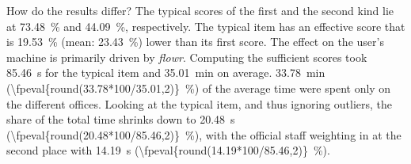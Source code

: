 \documentclass{article}
\def\share#1#2{\qty{\fpeval{round(#1*100/#2,2)}}{\percent}}
\begin{document}
\begin{answers}{How do the results differ?}{
  The typical scores of the first and the second kind lie at \qty{73.48}{\percent} and
  \qty{44.09}{\percent}, respectively. The typical item has an effective score that is
  \qty{19.53}{\percent} (mean: \qty{23.43}{\percent}) lower than its first score.}
  The effect on the user's machine is primarily driven by \emph{flowr}. Computing the
  sufficient scores took \qty{85.46}{\second} for the typical item and
  \qty{35.01}{\minute} on average. \qty{33.78}{\minute} (\share{33.78}{35.01}) of the
  average time were spent only on the different offices. Looking at the typical item,
  and thus ignoring outliers, the share of the total time shrinks down to
  \qty{20.48}{\second} (\share{20.48}{85.46}), with the official staff weighting in at
  the second place with \qty{14.19}{\second} (\share{14.19}{85.46}).
\end{answers}
\gdef\SatexReachedEnd{}
\end{document}
